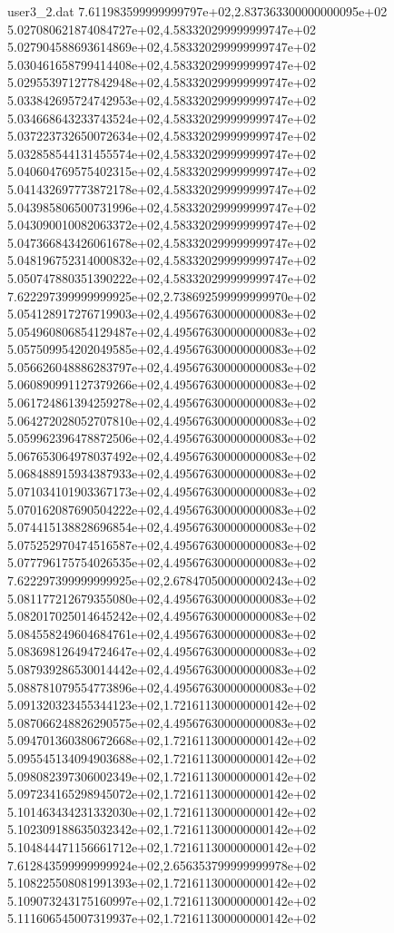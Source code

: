\begin{filecontents}{user3_2.dat}
7.611983599999999797e+02,2.837363300000000095e+02
5.027080621874084727e+02,4.583320299999999747e+02
5.027904588693614869e+02,4.583320299999999747e+02
5.030461658799414408e+02,4.583320299999999747e+02
5.029553971277842948e+02,4.583320299999999747e+02
5.033842695724742953e+02,4.583320299999999747e+02
5.034668643233743524e+02,4.583320299999999747e+02
5.037223732650072634e+02,4.583320299999999747e+02
5.032858544131455574e+02,4.583320299999999747e+02
5.040604769575402315e+02,4.583320299999999747e+02
5.041432697773872178e+02,4.583320299999999747e+02
5.043985806500731996e+02,4.583320299999999747e+02
5.043090010082063372e+02,4.583320299999999747e+02
5.047366843426061678e+02,4.583320299999999747e+02
5.048196752314000832e+02,4.583320299999999747e+02
5.050747880351390222e+02,4.583320299999999747e+02
7.622297399999999925e+02,2.738692599999999970e+02
5.054128917276719903e+02,4.495676300000000083e+02
5.054960806854129487e+02,4.495676300000000083e+02
5.057509954202049585e+02,4.495676300000000083e+02
5.056626048886283797e+02,4.495676300000000083e+02
5.060890991127379266e+02,4.495676300000000083e+02
5.061724861394259278e+02,4.495676300000000083e+02
5.064272028052707810e+02,4.495676300000000083e+02
5.059962396478872506e+02,4.495676300000000083e+02
5.067653064978037492e+02,4.495676300000000083e+02
5.068488915934387933e+02,4.495676300000000083e+02
5.071034101903367173e+02,4.495676300000000083e+02
5.070162087690504222e+02,4.495676300000000083e+02
5.074415138828696854e+02,4.495676300000000083e+02
5.075252970474516587e+02,4.495676300000000083e+02
5.077796175754026535e+02,4.495676300000000083e+02
7.622297399999999925e+02,2.678470500000000243e+02
5.081177212679355080e+02,4.495676300000000083e+02
5.082017025014645242e+02,4.495676300000000083e+02
5.084558249604684761e+02,4.495676300000000083e+02
5.083698126494724647e+02,4.495676300000000083e+02
5.087939286530014442e+02,4.495676300000000083e+02
5.088781079554773896e+02,4.495676300000000083e+02
5.091320323455344123e+02,1.721611300000000142e+02
5.087066248826290575e+02,4.495676300000000083e+02
5.094701360380672668e+02,1.721611300000000142e+02
5.095545134094903688e+02,1.721611300000000142e+02
5.098082397306002349e+02,1.721611300000000142e+02
5.097234165298945072e+02,1.721611300000000142e+02
5.101463434231332030e+02,1.721611300000000142e+02
5.102309188635032342e+02,1.721611300000000142e+02
5.104844471156661712e+02,1.721611300000000142e+02
7.612843599999999924e+02,2.656353799999999978e+02
5.108225508081991393e+02,1.721611300000000142e+02
5.109073243175160997e+02,1.721611300000000142e+02
5.111606545007319937e+02,1.721611300000000142e+02

\end{filecontents}
